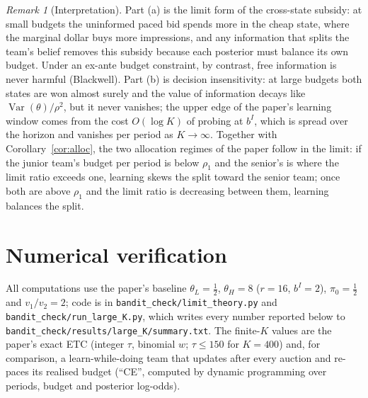\documentclass[11pt]{article}
\theoremstyle{definition}
\theoremstyle{remark}
\newtheorem{remark}{Remark}
\DeclareMathOperator{\Var}{Var}
\begin{document}
\begin{remark}[Interpretation]
Part (a) is the limit form of the cross-state subsidy: at small budgets the uninformed paced bid spends more in the
cheap state, where the marginal dollar buys more impressions, and any information that splits the team's belief removes this
subsidy because each posterior must balance its own budget. Under an ex-ante budget constraint, by contrast, free
information is never harmful (Blackwell). Part (b) is decision insensitivity: at large budgets both states are won
almost surely and the value of information decays like $\Var(\theta)/\rho^2$, but it never vanishes; the
upper edge of the paper's learning window comes from the cost $O(\log K)$ of probing at $b^I$, which is spread over
the horizon and vanishes per period as $K\to\infty$. Together with Corollary~\ref{cor:alloc}, the two allocation regimes of
the paper follow in the limit: if the junior team's budget per period is below $\rho_1$ and the senior's is where the
limit ratio exceeds one, learning skews the split toward the senior team; once both are above $\rho_1$ and the limit
ratio is decreasing between them, learning balances the split.
\end{remark}

\section{Numerical verification}\label{sec:numerics}

All computations use the paper's baseline $\theta_L=\tfrac12$, $\theta_H=8$ ($r=16$, $b^I=2$), $\pi_0=\tfrac12$ and
$v_1/v_2=2$; code is in \texttt{bandit\_check/limit\_theory.py} and \texttt{bandit\_check/run\_large\_K.py}, which
writes every number reported below to \texttt{bandit\_check/results/large\_K/summary.txt}.
The finite-$K$ values are the paper's exact ETC (integer $\tau$, binomial $w$; $\tau\le150$ for $K=400$) and, for
comparison, a learn-while-doing team that updates after every auction and re-paces its realised budget (``CE'',
computed by dynamic programming over periods, budget and posterior log-odds).
\end{document}
